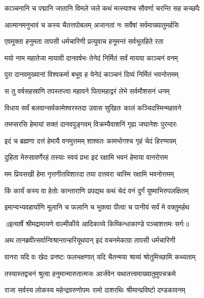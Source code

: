 \twolineshloka
{काञ्चनानि च पद्मानि जातानि विमले जले}
{कथं मत्स्याश्च सौवर्णा चरन्ति सह कच्छपैः} %

\twolineshloka
{आत्मानमनुभावं च कस्य चैतत्तपोबलम्}
{अजानतां नः सर्वेषां सर्वमाख्यातुमर्हसि} %

\twolineshloka
{एवमुक्ता हनुमता तापसी धर्मचारिणी}
{प्रत्युवाच हनूमन्तं सर्वभूतहिते रता} %

\twolineshloka
{मयो नाम महातेजा मायावी दानवर्षभः}
{तेनेदं निर्मितं सर्वं मायया काञ्चनं वनम्} %

\twolineshloka
{पुरा दानवमुख्यानां विश्वकर्मा बभूव ह}
{येनेदं काञ्चनं दिव्यं निर्मितं भवनोत्तमम्} %

\twolineshloka
{स तु वर्षसहस्राणि तपस्तप्त्वा महावने}
{पितामहाद्वरं लेभे सर्वमौशसनं धनम्} %

\twolineshloka
{विधाय सर्वं बलवान्सर्वकामेश्वरस्तदा}
{उवास सुखितः कालं कञ्चिदस्मिन्महावने} %

\twolineshloka
{तमप्सरसि हेमायां सक्तं दानवपुङ्गवम्}
{विक्रम्यैवाशनिं गृह्य जघानेशः पुरन्दरः} %

\twolineshloka
{इदं च ब्रह्मणा दत्तं हेमायै वनमुत्तमम्}
{शाश्वतः कामभोगश्च गृहं चेदं हिरण्मयम्} %

\twolineshloka
{दुहिता मेरुसावर्णेरहं तस्याः स्वयं प्रभा}
{इदं रक्षामि भवनं हेमाया वानरोत्तम} %

\twolineshloka
{मम प्रियसखी हेमा नृत्तगीतविशारदा}
{तया दत्तवरा चास्मि रक्षामि भवनोत्तमम्} %

\twolineshloka
{किं कार्यं कस्य वा हेतोः कान्ताराणि प्रपद्यथ}
{कथं चेदं वनं दुर्गं युष्माभिरुपलक्षितम्} %

\twolineshloka
{इमान्यभ्यवहार्याणि मूलानि च फलानि च}
{भुक्त्वा पीत्वा च पानीयं सर्वं मे वक्तुमर्हथ} %


{॥इत्यार्षे श्रीमद्रामायणे वाल्मीकीये आदिकाव्ये किष्किन्धाकाण्डे पञ्चाशत्तमः सर्गः॥}


\twolineshloka
{अथ तानब्रवीत्सर्वान्विश्रान्तान्हरियूथपान्}
{इदं वचनमेकाग्रा तापसी धर्मचारिणी} %

\twolineshloka
{वानरा यदि वः खेदः प्रनष्टः फलभक्षणात्}
{यदि चैतन्मया श्राव्यं श्रोतुमिच्छामि कथ्यताम्} %

\twolineshloka
{तस्यास्तद्वचनं श्रुत्वा हनुमान्मारुतात्मजः}
{आर्जवेन यथातत्त्वमाख्यातुमुपचक्रमे} %

\twolineshloka
{राजा सर्वस्य लोकस्य महेन्द्रवरुणोपमः}
{रामो दाशरथिः श्रीमान्प्रविष्टो दण्डकावनम्} %

